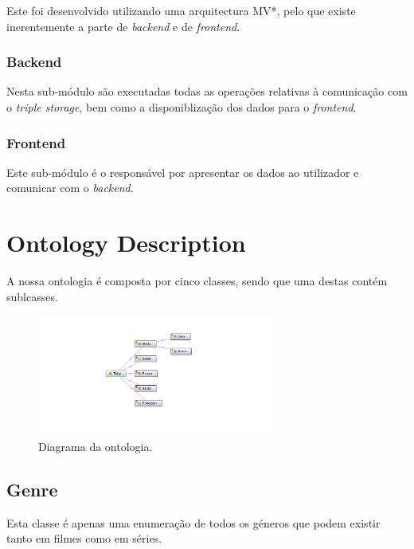 \documentclass[a4paper]{article}
\begin{document}
Este foi desenvolvido utilizando uma arquitectura MV*, pelo que existe inerentemente a parte de \textit{backend} e de \textit{frontend}.

\subsubsection{Backend}
\indent \indent Nesta sub-módulo são executadas todas as operações relativas à comunicação com o \textit{triple storage}, bem como a disponiblização dos dados para o \textit{frontend}.

\subsubsection{Frontend}
\indent \indent Este sub-módulo é o responsável por apresentar os dados ao utilizador e comunicar com o \textit{backend}.

\section{Ontology Description}
\indent \indent A nossa ontologia é composta por cinco classes, sendo que uma destas contém sublcasses.

\begin{figure}[h]
	\vspace{20pt}
	\begin{center}
		\includegraphics[width=0.7\textwidth]{imgs/onto.png}
	\end{center}
	\caption{Diagrama da ontologia.}
\end{figure}

\subsection{Genre}
\indent \indent Esta classe é apenas uma enumeração de todos os géneros que podem existir tanto em filmes como em séries.
\end{document}
